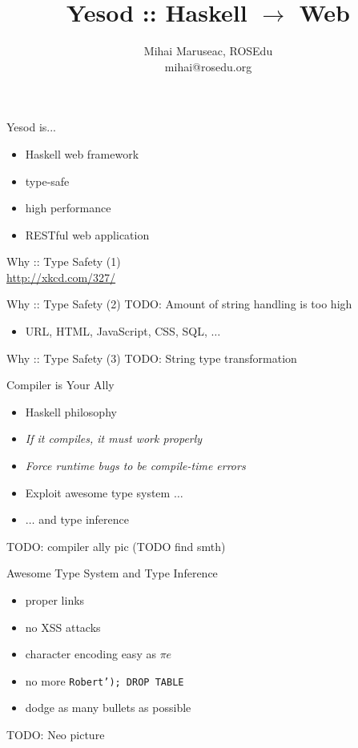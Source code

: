 \documentclass{beamer}
\title{Yesod :: Haskell $\rightarrow$ Web}
\author{Mihai Maruseac, ROSEdu\\mihai@rosedu.org}
\begin{document}
\maketitle

\begin{frame}{Yesod is...}
  \begin{itemize}[<+->]
    \item Haskell web framework
    \item type-safe
    \item high performance
    \item RESTful web application
  \end{itemize}
  \vspace{-3cm}
  \hspace{6cm}
\end{frame}

\begin{frame}{Why :: Type Safety (1)}
  \\
  \url{http://xkcd.com/327/}
\end{frame}

\begin{frame}{Why :: Type Safety (2)}
  TODO: Amount of string handling is too high
  \begin{itemize}
    \item URL, HTML, JavaScript, CSS, SQL, $\ldots$
  \end{itemize}
\end{frame}

\begin{frame}{Why :: Type Safety (3)}
  TODO: String type transformation
\end{frame}

\begin{frame}{Compiler is Your Ally}
  \begin{itemize}[<+->]
    \item Haskell philosophy
    \item \textit{If it compiles, it must work properly}
    \item \textit{Force runtime bugs to be compile-time errors}
    \item Exploit awesome type system $\ldots$
    \item $\ldots$ and type inference
  \end{itemize}
  TODO: compiler ally pic (TODO find smth)
\end{frame}

\begin{frame}{Awesome Type System and Type Inference}
  \begin{itemize}[<+->]
    \item proper links
    \item no XSS attacks
    \item character encoding easy as $\pi e$
    \item no more \texttt{Robert'); DROP TABLE}
    \item dodge as many bullets as possible
  \end{itemize}
  TODO: Neo picture
\end{frame}
\end{document}
